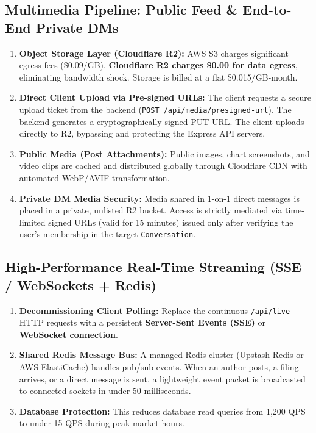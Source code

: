 \documentclass[11pt,a4paper]{article}
\begin{document}
\subsection{Multimedia Pipeline: Public Feed \& End-to-End Private DMs}
\begin{enumerate}
    \item \textbf{Object Storage Layer (Cloudflare R2):}
    AWS S3 charges significant egress fees (\$0.09/GB). \textbf{Cloudflare R2 charges \$0.00 for data egress}, eliminating bandwidth shock. Storage is billed at a flat \$0.015/GB-month.
    \item \textbf{Direct Client Upload via Pre-signed URLs:}
    The client requests a secure upload ticket from the backend (\texttt{POST /api/media/presigned-url}). The backend generates a cryptographically signed PUT URL. The client uploads directly to R2, bypassing and protecting the Express API servers.
    \item \textbf{Public Media (Post Attachments):}
    Public images, chart screenshots, and video clips are cached and distributed globally through Cloudflare CDN with automated WebP/AVIF transformation.
    \item \textbf{Private DM Media Security:}
    Media shared in 1-on-1 direct messages is placed in a private, unlisted R2 bucket. Access is strictly mediated via time-limited signed URLs (valid for 15 minutes) issued only after verifying the user's membership in the target \texttt{Conversation}.
\end{enumerate}

\subsection{High-Performance Real-Time Streaming (SSE / WebSockets + Redis)}
\begin{enumerate}
    \item \textbf{Decommissioning Client Polling:} Replace the continuous \texttt{/api/live} HTTP requests with a persistent \textbf{Server-Sent Events (SSE)} or \textbf{WebSocket connection}.
    \item \textbf{Shared Redis Message Bus:} A managed Redis cluster (Upstash Redis or AWS ElastiCache) handles pub/sub events. When an author posts, a filing arrives, or a direct message is sent, a lightweight event packet is broadcasted to connected sockets in under 50 milliseconds.
    \item \textbf{Database Protection:} This reduces database read queries from 1,200 QPS to under 15 QPS during peak market hours.
\end{enumerate}
\end{document}
